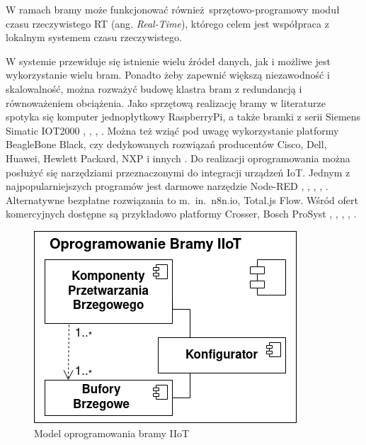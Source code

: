 \documentclass[a4paper, 12pt, twoside]{article}
\begin{document}
W ramach bramy może funkcjonować również sprzętowo-programowy moduł
czasu rzeczywistego RT (ang. \emph{Real-Time}), którego celem jest współpraca
z lokalnym systemem czasu rzeczywistego.

W systemie przewiduje się istnienie wielu źródeł
danych, jak i możliwe jest wykorzystanie wielu bram. Ponadto żeby zapewnić
większą niezawodność i skalowalność,
można rozważyć budowę klastra bram z redundancją i równoważeniem obciążenia.
Jako sprzętową realizację bramy w literaturze spotyka się komputer jednopłytkowy
RaspberryPi, a także bramki z serii Siemens Simatic IOT2000
\cite{iiot-opensource-gateway}, \cite{design-impl-node-gateway},
\cite{low-cost-esp32-pi-node-red-scada}, \cite{modbus-iot-gateway}. Można też
wziąć pod uwagę wykorzystanie platformy BeagleBone Black, czy dedykowanych rozwiązań
producentów Cisco, Dell, Huawei, Hewlett Packard, NXP i innych \cite{gateways}.
Do realizacji oprogramowania można posłużyć się narzędziami przeznaczonymi do
integracji urządzeń IoT. Jednym z najpopularniejszych programów jest
darmowe narzędzie Node-RED \cite{flow-programming}, \cite{iot-gateway-medical-and-industrial},
\cite{design-impl-node-gateway}, \cite{iiot-opensource-gateway}, \cite{low-cost-esp32-pi-node-red-scada}.
Alternatywne bezpłatne rozwiązania to m.~in.~n8n.io, Total.js Flow.
Wśród ofert komercyjnych dostępne są przykładowo platformy Crosser, Bosch ProSyst
\cite{node-red}, \cite{n8n}, \cite{total-js-flow}, \cite{crosser}, \cite{gateways}.

\begin{figure}
      \centering
      \includegraphics[scale=0.4]{oprog_bramy.png}
      \caption{Model oprogramowania bramy IIoT}
      \label{fig:gateway_soft}
\end{figure}
\end{document}
